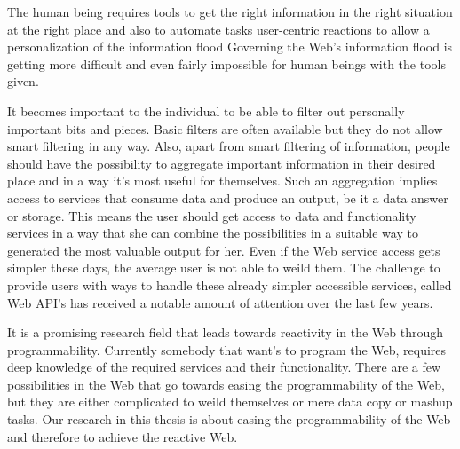 The human being requires tools to get the right information in the right situation at the right place and also to automate tasks
user-centric reactions to allow a personalization of the information flood
Governing the Web's information flood is getting more difficult and even fairly impossible for human beings with the tools given.


It becomes important to the individual to be able to filter out personally important bits and pieces.
Basic filters are often available but they do not allow smart filtering in any way.
Also, apart from smart filtering of information, people should have the possibility to aggregate important information in their desired place and in a way it's most useful for themselves.
Such an aggregation implies access to services that consume data and produce an output, be it a data answer or storage.
This means the user should get access to data and functionality services in a way that she can combine the possibilities in a suitable way to generated the most valuable output for her.
Even if the Web service access gets simpler these days, the average user is not able to weild them.
The challenge to provide users with ways to handle these already simpler accessible services, called Web API's has received a notable amount of attention over the last few years.




It is a promising research field that leads towards reactivity in the Web through programmability.
Currently somebody that want's to program the Web, requires deep knowledge of the required services and their functionality.
There are a few possibilities in the Web that go towards easing the programmability of the Web, but they are either complicated to weild themselves or mere data copy or mashup tasks.
Our research in this thesis is about easing the programmability of the Web and therefore to achieve the reactive Web. 
